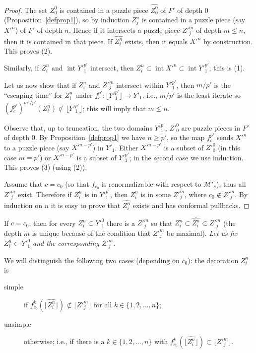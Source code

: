 \documentclass[12pt,a4paper]{amsart}
\newcommand{\MMp}{\mathcal M'}
\newcommand{\intr}{\operatorname{int}}
\begin{document}
\begin{proof}
 The set $Z^0_0$ is contained in a puzzle piece $\widehat{Z^0_0}$ of $F'$ of
depth $0$ (Proposition~\ref{defprop1}), so by induction $Z^n_j$ is
contained in a puzzle piece (say $X'^n$) of $F'$ of depth $n$. Hence
if it intersects a puzzle piece $Z'^m_j$ of depth $m\le n$, then it
is contained in that piece. If $\widehat{Z^n_i}$ exists, then it
equals $X'^n$ by construction. This proves (2).


Similarly, if $Z^n_i$ and $\intr Y'^{p'}_1$ intersect, then
$Z^n_i\subset \intr X'^n\subset \intr Y'^{p'}_1$; this is (1).

Let us now show that if $Z^n_i$ and $Z'^m_j$ intersect within
$Y'^{p'}_1$, then $m/p'$ is the ``escaping time'' for $Z^n_i$ under
$f_c^{p'}:\lfloor Y'^{p'}_1\rfloor \rightarrow Y'_1$, i.e., $m/p'$
is the least iterate so $(f^{p'}_c)^{m'/p'}(Z^n_i)\not\subset
\lfloor Y'^{p'}_1 \rfloor$; this will imply that $m\le n$.

Observe that, up to truncation, the two domains $Y'^{p'}_1$,
$Z'^0_0$ are puzzle pieces in $F'$ of depth $0$. By
Proposition~\ref{defprop1} we have $n\ge p'$, so the map $f_c^{p'}$
sends $X'^n$ to a puzzle piece (say $X'^{n-p'}$) in $Y'_1$. Either
$X'^{n-p'}$ is a subset of $Z'^0_0$ (in this case $m=p'$) or
$X'^{n-p'}$ is a subset of $Y'^{p'}_1$; in the second case we use
induction. This proves (3) (using (2)).


Assume that $c=c_0$ (so that $f_{c_0}$ is renormalizable with
respect to $\MMp_s$); thus all $Z'^m_j$ exist. Therefore if $Z^n_i$
is in $Y'^{p'}_1$, then $Z^n_i$ is in some $Z'^m_j$, where
$c_0\not\in Z'^m_j$. By induction on $n$ it is easy to prove that
$\widehat{Z^n_i}$ exists and has conformal pullbacks.
\end{proof}

If $c=c_0$, then for every $Z^n_i\subset Y'^0_1$ there is a $Z'^m_j$
so that $Z^n_i\subset\widehat{Z^n_i}\subset Z'^m_j$ (the depth $m$
is unique because of the condition that $Z'^m_j$ be maximal).
\textit{Let us fix $Z^n_i\subset Y'^0_1$ and the corresponding
$Z'^m_j$.}

We will distinguish the following two cases (depending on $c_0$):
the decoration ${Z^n_i}$ is
\begin{description}
\item[simple] if
$f_{c_0}^k\left(\lfloor \widehat{Z^n_i}\rfloor\right)\not\subset
\lfloor Z'^m_j\rfloor$ for all $k\in\{1,2,\dots,n\}$;

\item[unsimple] otherwise; i.e., if there is a $k\in\{1,2,\dots,n\}$ with
$f_{c_0}^k\left(\lfloor \widehat{Z^n_i}\rfloor\right)\subset \lfloor
Z'^m_j\rfloor$.
\end{description}
\end{document}
